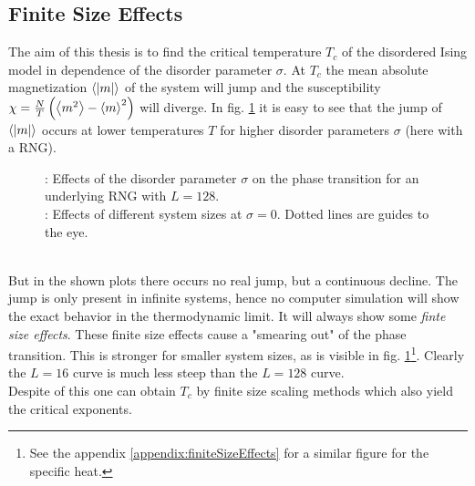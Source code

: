 \subsection{Finite Size Effects}
\label{ssec:finitesize}
    The aim of this thesis is to find the critical temperature \(T_c\)
    of the disordered Ising model in dependence of the disorder parameter
    \(\sigma\). At \(T_c\) the mean absolute magnetization \(\left< |m| \right>\) of
    the system will jump and the susceptibility
    \(\chi = \frac{N}{T}\left(\left< m^2 \right>-\left< m \right>^2\right)\)
    will diverge. In fig. \ref{fig:smeared_out}
    it is easy to see that the jump of \(\left< |m| \right>\)
    occurs at lower temperatures \(T\) for higher
    disorder parameters \(\sigma\) (here with a RNG).
    \begin{figure}[htbp]
        \centering
        \caption[Phase Transition and Finite Size Effects]
        {
            : Effects of the disorder
            parameter $\sigma$ on the phase transition
            for an underlying RNG with $L=128$.\\
            : Effects of different system
            sizes at \(\sigma = 0\). Dotted lines are guides to the eye.
        }
        \label{fig:smeared_out}
    \end{figure}\\
    But in the shown plots there occurs no real jump, but a continuous
    decline. The jump is only present in infinite systems, hence no
    computer simulation will show the exact behavior in the
    thermodynamic limit. It will always show some \emph{finte size effects}.
    These finite size effects cause a "smearing out" of the phase
    transition. This is stronger for smaller system sizes, as is visible
    in fig. \ref{fig:smeared_out}\footnote{See the appendix \ref{appendix:finiteSizeEffects} for a similar figure for the specific heat.}.
    Clearly the \(L=16\) curve is much less steep than the \(L=128\) curve.\\
    Despite of this one can obtain \(T_c\) by finite size scaling
    methods \cite[S. ??]{NewmanBarkema1999} which also yield the critical
    exponents.

